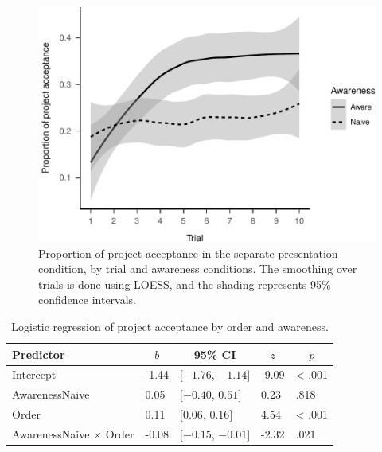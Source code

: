 \documentclass[
  english,
  man, donotrepeattitle,floatsintext]{apa7}
\begin{document}
\begin{figure}
\centering
\includegraphics{aggregation_trials_files/figure-latex/plot-separate-trial-awareness-1.pdf}
\caption{\label{fig:plot-separate-trial-awareness}Proportion of project acceptance in the separate presentation condition, by trial and awareness conditions. The smoothing over trials is done using LOESS, and the shading represents 95\% confidence intervals.}
\end{figure}

\begin{table}[tbp]

\begin{center}
\begin{threeparttable}

\caption{\label{tab:separate-trial-awareness-tab}Logistic regression of project acceptance by order and awareness.}

\begin{tabular}{lllll}
\toprule
Predictor & \multicolumn{1}{c}{$b$} & \multicolumn{1}{c}{95\% CI} & \multicolumn{1}{c}{$z$} & \multicolumn{1}{c}{$p$}\\
\midrule
Intercept & -1.44 & $[-1.76$, $-1.14]$ & -9.09 & < .001\\
AwarenessNaive & 0.05 & $[-0.40$, $0.51]$ & 0.23 & .818\\
Order & 0.11 & $[0.06$, $0.16]$ & 4.54 & < .001\\
AwarenessNaive $\times$ Order & -0.08 & $[-0.15$, $-0.01]$ & -2.32 & .021\\
\bottomrule
\end{tabular}

\end{threeparttable}
\end{center}

\end{table}
\end{document}

